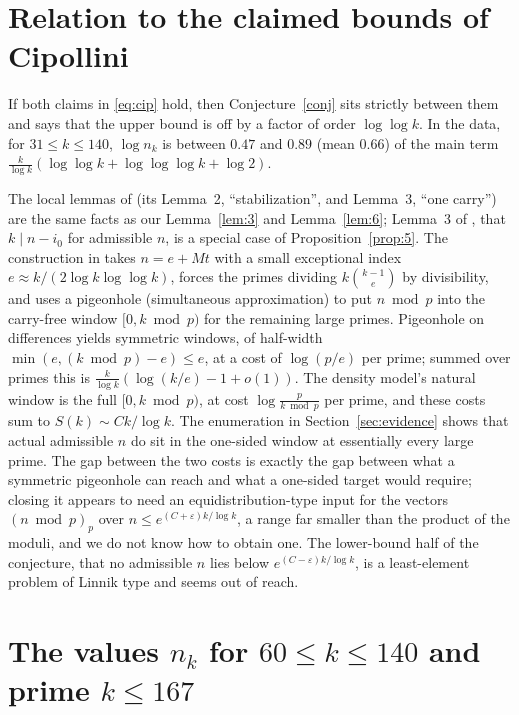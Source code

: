 \documentclass[11pt]{amsart}
\theoremstyle{remark}
\begin{document}
\section{Relation to the claimed bounds of Cipollini}\label{sec:cip}

If both claims in \eqref{eq:cip} hold, then Conjecture~\ref{conj} sits strictly between them and says that the upper bound is off by a factor of order $\log\log k$. In the data, for $31\le k\le140$, $\log n_k$ is between $0.47$ and $0.89$ (mean $0.66$) of the main term $\frac k{\log k}(\log\log k+\log\log\log k+\log2)$.

The local lemmas of \cite{Ci26a} (its Lemma~2, ``stabilization'', and Lemma~3, ``one carry'') are the same facts as our Lemma~\ref{lem:3} and Lemma~\ref{lem:6}; Lemma~3 of \cite{Ci26b}, that $k\mid n-i_0$ for admissible $n$, is a special case of Proposition~\ref{prop:5}. The construction in \cite{Ci26a} takes $n=e+Mt$ with a small exceptional index $e\approx k/(2\log k\log\log k)$, forces the primes dividing $k\binom{k-1}e$ by divisibility, and uses a pigeonhole (simultaneous approximation) to put $n\bmod p$ into the carry-free window $[0,k\bmod p)$ for the remaining large primes. Pigeonhole on differences yields symmetric windows, of half-width $\min(e,(k\bmod p)-e)\le e$, at a cost of $\log(p/e)$ per prime; summed over primes this is $\frac k{\log k}(\log(k/e)-1+o(1))$. The density model's natural window is the full $[0,k\bmod p)$, at cost $\log\frac{p}{k\bmod p}$ per prime, and these costs sum to $S(k)\sim Ck/\log k$. The enumeration in Section~\ref{sec:evidence} shows that actual admissible $n$ do sit in the one-sided window at essentially every large prime. The gap between the two costs is exactly the gap between what a symmetric pigeonhole can reach and what a one-sided target would require; closing it appears to need an equidistribution-type input for the vectors $(n\bmod p)_{p}$ over $n\le e^{(C+\varepsilon)k/\log k}$, a range far smaller than the product of the moduli, and we do not know how to obtain one. The lower-bound half of the conjecture, that no admissible $n$ lies below $e^{(C-\varepsilon)k/\log k}$, is a least-element problem of Linnik type and seems out of reach.

\appendix
\section{The values \texorpdfstring{$n_k$}{n\_k} for \texorpdfstring{$60\le k\le140$}{60 <= k <= 140} and prime \texorpdfstring{$k\le167$}{k <= 167}}
\end{document}
